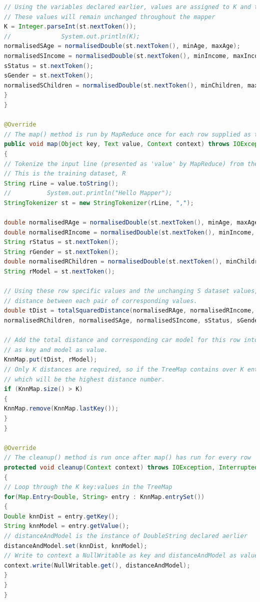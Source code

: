 \documentclass[11pt,article]{memoir}
\begin{document}
\begin{flushleft}
\begin{lstlisting}[language=java]
// Using the variables declared earlier, values are assigned to K and to the test dataset, S.
// These values will remain unchanged throughout the mapper
K = Integer.parseInt(st.nextToken());
//				System.out.println(K);
normalisedSAge = normalisedDouble(st.nextToken(), minAge, maxAge);
normalisedSIncome = normalisedDouble(st.nextToken(), minIncome, maxIncome);
sStatus = st.nextToken();
sGender = st.nextToken();
normalisedSChildren = normalisedDouble(st.nextToken(), minChildren, maxChildren);
}
}

@Override
// The map() method is run by MapReduce once for each row supplied as the input data
public void map(Object key, Text value, Context context) throws IOException, InterruptedException
{
// Tokenize the input line (presented as 'value' by MapReduce) from the csv file
// This is the training dataset, R
String rLine = value.toString();
//			System.out.println("Hello Mapper");
StringTokenizer st = new StringTokenizer(rLine, ",");

double normalisedRAge = normalisedDouble(st.nextToken(), minAge, maxAge);
double normalisedRIncome = normalisedDouble(st.nextToken(), minIncome, maxIncome);
String rStatus = st.nextToken();
String rGender = st.nextToken();
double normalisedRChildren = normalisedDouble(st.nextToken(), minChildren, maxChildren);
String rModel = st.nextToken();

// Using these row specific values and the unchanging S dataset values, calculate a total squared
// distance between each pair of corresponding values.
double tDist = totalSquaredDistance(normalisedRAge, normalisedRIncome, rStatus, rGender,
normalisedRChildren, normalisedSAge, normalisedSIncome, sStatus, sGender, normalisedSChildren);		

// Add the total distance and corresponding car model for this row into the TreeMap with distance
// as key and model as value.
KnnMap.put(tDist, rModel);
// Only K distances are required, so if the TreeMap contains over K entries, remove the last one
// which will be the highest distance number.
if (KnnMap.size() > K)
{
KnnMap.remove(KnnMap.lastKey());
}
}

@Override
// The cleanup() method is run once after map() has run for every row
protected void cleanup(Context context) throws IOException, InterruptedException
{
// Loop through the K key:values in the TreeMap
for(Map.Entry<Double, String> entry : KnnMap.entrySet())
{
Double knnDist = entry.getKey();
String knnModel = entry.getValue();
// distanceAndModel is the instance of DoubleString declared aerlier
distanceAndModel.set(knnDist, knnModel);
// Write to context a NullWritable as key and distanceAndModel as value
context.write(NullWritable.get(), distanceAndModel);
}
}
}
	

\end{lstlisting}
\end{flushleft}
\end{document}
